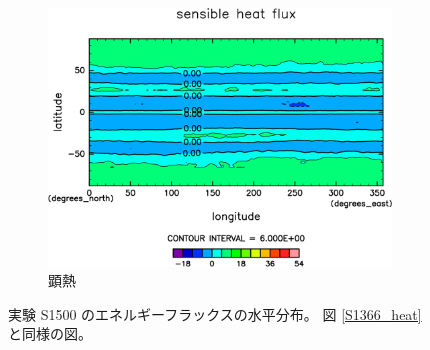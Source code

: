 \documentclass[body]{subfiles}
\begin{document}
\begin{figure}[t]
\begin{subfigure}{.4\textwidth}
		\includegraphics[width=\columnwidth]{S1500/Sens,time=3650:4015-crop-rotate.pdf}
		\caption{顕熱\hmu*{[W/m^{-2}]}}\label{S1500顕熱}
	\end{subfigure}
	\caption[実験 S1500 のエネルギーフラックスの水平分布]{
		実験 S1500 のエネルギーフラックスの水平分布。
		図 \ref{S1366_heat} と同様の図。
	}\label{S1500_heat}
\end{figure}
\end{document}
